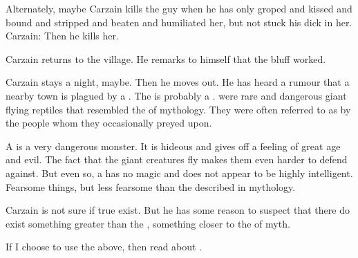 Alternately, maybe Carzain kills the guy when he has only groped and kissed and bound and stripped and beaten and humiliated her, but not stuck his dick in her.
Carzain: 
Then he kills her.



\begin{comment}
  \section{Killing the last bandits}
\end{comment}

Carzain returns to the village. 
He remarks to himself that the \Shurreem bluff worked. 

Carzain stays a night, maybe. 
Then he moves out.
He has heard a rumour that a nearby town is plagued by a \quo{\dragon}. 
The \quo{\dragon} is probably a \vreiid.
\Vreiid were rare and dangerous giant flying reptiles that resembled the \dragons of mythology. 
They were often referred to as \dragons by the people whom they occasionally preyed upon. 

A \vreiid is a very dangerous monster.
It is hideous and gives off a feeling of great age and evil. 
The fact that the giant creatures fly makes them even harder to defend against. 
But even so, a \vreiid has no magic and does not appear to be highly intelligent. 
Fearsome things, but less fearsome than the \dragons described in mythology.

Carzain is not sure if true \dragons exist. 
But he has some reason to suspect that there do exist something greater than the \vreiiden, something closer to the \dragons of myth. 

If I choose to use the above, then read about . 









